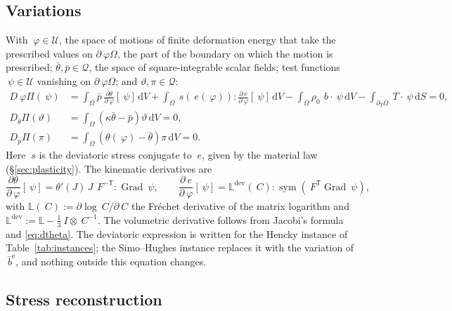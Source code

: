 \documentclass[11pt]{article}
\newcommand{\F}{~F}
\newcommand{\C}{~C}
\newcommand{\Id}{~I}
\newcommand{\edev}{~e}
\newcommand{\sdev}{~s}
\newcommand{\disp}{~\varphi}
\newcommand{\testd}{~\psi}
\newcommand{\bT}{~T}
\newcommand{\Grad}{\operatorname{Grad}}
\newcommand{\sym}{\operatorname{sym}}
\newcommand{\transpose}[1]{#1^{\mathsf{T}}}
\newcommand{\diff}{\,\mathrm{d}}
\newcommand{\supdev}{^{\mathrm{dev}}}
\theoremstyle{definition}
\theoremstyle{plain}
\begin{document}
\subsection{Variations}
\label{sec:variations}

With $\disp \in \mathcal{U}$, the space of motions of finite deformation
energy that take the prescribed values on $\partial_\disp\Omega$, the part of
the boundary on which the motion is prescribed; $\bar\theta, \bar p \in
\mathcal{Q}$, the space of square-integrable scalar fields; test functions
$\testd \in \mathcal{U}$ vanishing on $\partial_\disp\Omega$; and
$\vartheta, \pi \in \mathcal{Q}$:
\begin{equation}
  \label{eq:variations}
  \begin{split}
    D_\disp \Pi(\testd) & =
      \int_\Omega \bar p \, \frac{\partial\theta}{\partial\disp}[\testd] \diff V
      + \int_\Omega \sdev\!\left(\edev(\disp)\right) : \frac{\partial\edev}{\partial\disp}[\testd] \diff V
      - \int_\Omega \rho_0\,~b\cdot\testd \diff V
      - \int_{\partial_T\Omega} \bT\cdot\testd \diff S = 0,
    \\
    D_{\bar\theta}\Pi(\vartheta) & =
      \int_\Omega \left( \kappa\bar\theta - \bar p \right)\vartheta \diff V = 0,
    \\
    D_{\bar p}\Pi(\pi) & =
      \int_\Omega \left( \theta(\disp) - \bar\theta \right)\pi \diff V = 0 .
  \end{split}
\end{equation}
Here $\sdev$ is the deviatoric stress conjugate to $\edev$, given by the
material law (\S\ref{sec:plasticity}). The kinematic derivatives are
\begin{equation}
  \label{eq:kinematic}
  \frac{\partial\theta}{\partial\disp}[\testd]
    = \theta'(J)\, J\, \F^{-\mathsf{T}} : \Grad\testd,
  \qquad
  \frac{\partial\edev}{\partial\disp}[\testd]
    = \mathbb{L}\supdev(\C) : \sym\!\left(\transpose{\F}\Grad\testd\right),
\end{equation}
with $\mathbb{L}(\C) := \partial \log\C/\partial\C$ the Fr\'echet derivative of
the matrix logarithm \citep{AlMohy.Higham.Relton:2013} and
$\mathbb{L}\supdev := \mathbb{L} - \tfrac13 \Id \otimes \C^{-1}$. The
volumetric derivative follows from Jacobi's formula and \eqref{eq:dtheta}. The
deviatoric expression is written for the Hencky instance of
Table~\ref{tab:instances}; the Simo--Hughes instance replaces it with the
variation of $\bar{~b}^{\mathrm e}$, and nothing outside this equation
changes.

\subsection{Stress reconstruction}
\label{sec:stress}
\end{document}
